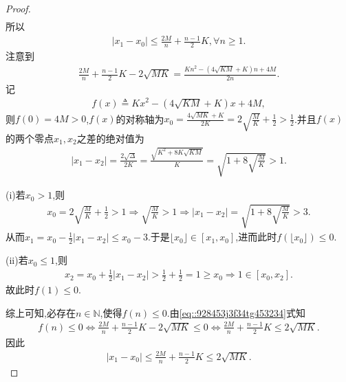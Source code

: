\documentclass[../../main.tex]{subfiles}%
\begin{document}
\begin{proof}
\begin{align*}
\end{align*}
所以
\begin{align*}
|x_1 - x_0| \leqslant \frac{2M}{n} + \frac{n-1}{2}K, \forall n \geqslant 1.
\end{align*}
注意到
\begin{align}
\frac{2M}{n} + \frac{n-1}{2}K - 2\sqrt{MK} = \frac{Kn^2 - (4\sqrt{KM} + K)n + 4M}{2n}. \label{eq::928453j3f34tg453234}
\end{align}
记
\begin{align*}
f(x) \triangleq Kx^2 - (4\sqrt{KM} + K)x + 4M,
\end{align*}
则$f(0) = 4M > 0$,$f(x)$的对称轴为$x_0=\frac{4\sqrt{MK} + K}{2K} = 2\sqrt{\frac{M}{K}} + \frac{1}{2} > \frac{1}{2}$.并且$f(x)$的两个零点$x_1,x_2$之差的绝对值为
\begin{align*}
|x_1-x_2|=\frac{2\sqrt{\Delta}}{2K} = \frac{\sqrt{K^2 + 8K\sqrt{KM}}}{K} = \sqrt{1 + 8\sqrt{\frac{M}{K}}} > 1.
\end{align*}

(i)若$x_0>1$,则
\begin{align*}
x_0=2\sqrt{\frac{M}{K}}+\frac{1}{2}>1\Longrightarrow \sqrt{\frac{M}{K}}>1\Longrightarrow \left| x_1-x_2 \right|=\sqrt{1+8\sqrt{\frac{M}{K}}}>3.
\end{align*}
从而$x_1=x_0-\frac{1}{2}\left| x_1-x_2 \right|\leqslant x_0-3$.于是$\lfloor x_0 \rfloor \in \left[ x_1,x_0 \right]$,进而此时$f\left( \lfloor x_0 \rfloor \right) \leqslant 0$.

(ii)若$x_0\leqslant 1$,则
\begin{align*}
x_2=x_0+\frac{1}{2}\left| x_1-x_2 \right|>\frac{1}{2}+\frac{1}{2}=1\geqslant x_0\Longrightarrow 1\in \left[ x_0,x_2 \right].
\end{align*}
故此时$f\left( 1 \right) \leqslant 0$.

综上可知,必存在$n \in \mathbb{N}$,使得$f(n) \leqslant 0$.由\eqref{eq::928453j3f34tg453234}式知
\begin{align*}
f(n) \leqslant 0 \Longleftrightarrow \frac{2M}{n} + \frac{n-1}{2}K - 2\sqrt{MK} \leqslant 0 \Longleftrightarrow \frac{2M}{n} + \frac{n-1}{2}K \leqslant 2\sqrt{MK}.
\end{align*}
因此
\begin{align*}
|x_1 - x_0| \leqslant \frac{2M}{n} + \frac{n-1}{2}K \leqslant 2\sqrt{MK}.
\end{align*}


\end{proof}
\end{document}
